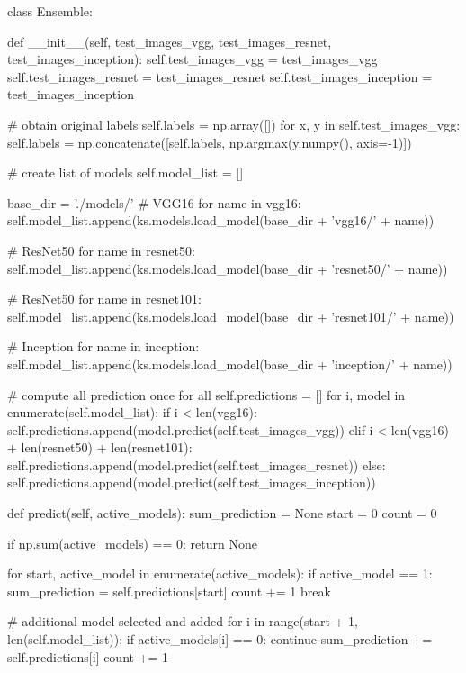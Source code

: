 \begin{python}
class Ensemble:

    def __init__(self, test_images_vgg, test_images_resnet, test_images_inception):
        self.test_images_vgg = test_images_vgg
        self.test_images_resnet = test_images_resnet
        self.test_images_inception = test_images_inception

        # obtain original labels
        self.labels = np.array([])
        for x, y in self.test_images_vgg:
            self.labels = np.concatenate([self.labels, np.argmax(y.numpy(), axis=-1)])

        # create list of models
        self.model_list = []

        base_dir = './models/'
        # VGG16
        for name in vgg16:
            self.model_list.append(ks.models.load_model(base_dir + 'vgg16/' + name))

        # ResNet50
        for name in resnet50:
            self.model_list.append(ks.models.load_model(base_dir + 'resnet50/' + name))

        # ResNet50
        for name in resnet101:
            self.model_list.append(ks.models.load_model(base_dir + 'resnet101/' + name))

        # Inception
        for name in inception:
            self.model_list.append(ks.models.load_model(base_dir + 'inception/' + name))

        # compute all prediction once for all
        self.predictions = []
        for i, model in enumerate(self.model_list):
            if i < len(vgg16):
                self.predictions.append(model.predict(self.test_images_vgg))
            elif i < len(vgg16) + len(resnet50) + len(resnet101):
                self.predictions.append(model.predict(self.test_images_resnet))
            else:
                self.predictions.append(model.predict(self.test_images_inception))

    def predict(self, active_models):
        sum_prediction = None
        start = 0
        count = 0

        if np.sum(active_models) == 0:
            return None

        for start, active_model in enumerate(active_models):
            if active_model == 1:
                sum_prediction = self.predictions[start]
                count += 1
                break

        # additional model selected and added
        for i in range(start + 1, len(self.model_list)):
            if active_models[i] == 0:
                continue
            sum_prediction += self.predictions[i]
            count += 1


\end{python}
